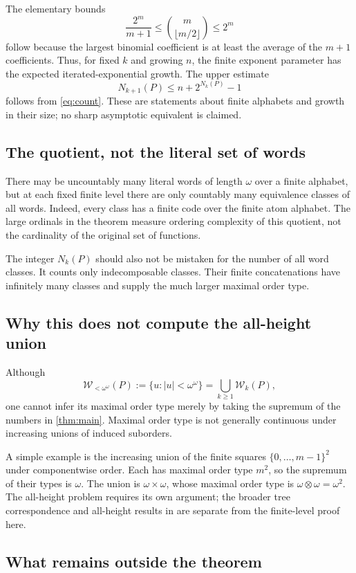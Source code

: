 \documentclass[11pt,letterpaper]{article}
\theoremstyle{definition}
\theoremstyle{remark}
\newcommand{\W}{\mathcal W}
\begin{document}
The elementary bounds
\[
  \frac{2^m}{m+1}\le\binom{m}{\lfloor m/2\rfloor}\le2^m
\]
follow because the largest binomial coefficient is at least the average
of the $m+1$ coefficients. Thus, for fixed $k$ and growing $n$, the
finite exponent parameter has the expected iterated-exponential growth.
The upper estimate
\[
  N_{k+1}(P)\le n+2^{N_k(P)}-1
\]
follows from \eqref{eq:count}. These are statements about finite alphabets
and growth in their size; no sharp asymptotic equivalent is claimed.

\subsection{The quotient, not the literal set of words}

There may be uncountably many literal words of length $\omega$ over a
finite alphabet, but at each fixed finite level there are only countably
many equivalence classes of all words. Indeed, every class has a finite
code over the finite atom alphabet. The large ordinals in the theorem
measure ordering complexity of this quotient, not the cardinality of
the original set of functions.

The integer $N_k(P)$ should also not be mistaken for the number of all
word classes. It counts only indecomposable classes. Their finite
concatenations have infinitely many classes and supply the much larger
maximal order type.

\subsection{Why this does not compute the all-height union}

Although
\[
  \W_{<\omega^\omega}(P):=\{u:|u|<\omega^\omega\}
  =\bigcup_{k\ge1}\W_k(P),
\]
one cannot infer its maximal order type merely by taking the supremum
of the numbers in \cref{thm:main}. Maximal order type is not generally
continuous under increasing unions of induced suborders.

A simple example is the increasing union of the finite squares
$\{0,\ldots,m-1\}^2$ under componentwise order. Each has maximal order
type $m^2$, so the supremum of their types is $\omega$. The union is
$\omega\times\omega$, whose maximal order type is
$\omega\otimes\omega=\omega^2$. The all-height problem requires its own
argument; the broader tree correspondence and all-height results in
\cite{ChopraPakhomov} are separate from the finite-level proof here.

\subsection{What remains outside the theorem}
\end{document}
